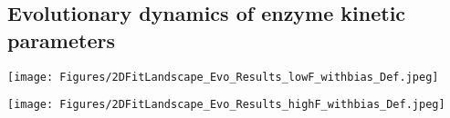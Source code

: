 \documentclass[11pt,onecolumn]{article}
\providecommand{\DIFadd}[1]{{\protect\color{blue} \sf #1}} %
\providecommand{\DIFdel}[1]{{\protect\color{red} \scriptsize #1}} %
\providecommand{\DIFaddFL}[1]{\DIFadd{#1}} %
\providecommand{\DIFdelFL}[1]{\DIFdel{#1}} %
\providecommand{\DIFaddbeginFL}{} %
\providecommand{\DIFaddendFL}{} %
\providecommand{\DIFdelbeginFL}{} %
\providecommand{\DIFdelendFL}{} %
\begin{document}
\subsection{Evolutionary dynamics of enzyme kinetic parameters}

\begin{figure*}[h!]
\centering
\DIFdelbeginFL %
\DIFdelendFL \DIFaddbeginFL \begin{minipage}[c]{0.5\linewidth}
\texttt{[image: Figures/2DFitLandscape\_Evo\_Results\_lowF\_withbias\_Def.jpeg]} 
\DIFaddendFL \end{minipage} \DIFdelbeginFL \DIFdelFL{\hspace{-0.5cm}%
}%
\DIFdelendFL \DIFaddbeginFL \DIFaddFL{\hspace{0.5cm}}\hfill
\begin{minipage}[c]{0.46\linewidth}
\texttt{[image: Figures/2DFitLandscape\_Evo\_Results\_highF\_withbias\_Def.jpeg]} 
\DIFaddendFL \end{minipage}

\end{figure*}
\end{document}
